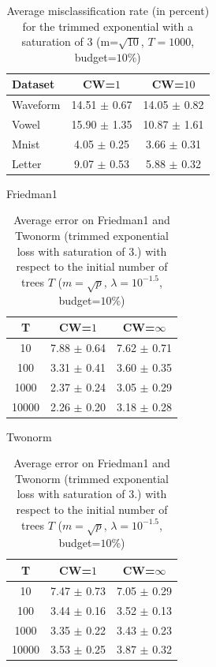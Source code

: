 \documentclass{article}
\newcommand{\bestA}{\cellcolor{orange}}
\begin{document}
\begin{table}[t]
\caption{Average misclassification rate (in percent) for the trimmed 
exponential with a saturation of $3$ (m=$\sqrt{10}$, $T=1000$, budget=$10\%$)}
\label{tab:cwMulti}
\vskip 0.15in
\begin{center}
\begin{small}
\begin{sc}
\begin{tabular}{l|cc}
\hline
Dataset & CW=$1$ & CW=$10$ \\
\hline
Waveform & 14.51 $\pm$ 0.67 & \bestA 14.05 $\pm$ 0.82 \\
Vowel & 15.90 $\pm$ 1.35 & \bestA 10.87 $\pm$ 1.61 \\
Mnist & 4.05 $\pm$ 0.25 & \bestA 3.66 $\pm$ 0.31 \\
Letter & 9.07 $\pm$ 0.53 & \bestA 5.88 $\pm$ 0.32 \\
\hline
\end{tabular}
\end{sc}
\end{small}
\end{center}
\vskip -0.1in
\end{table}



\begin{table}[t]
\caption{Average error on Friedman1 and Twonorm (trimmed exponential loss with 
saturation of $3$.) with respect to the initial number of trees $T$
($m=\sqrt{p}$, $\lambda=10^{-1.5}$, budget=$10\%$)}
\label{tab:poolsizeError}
\vskip 0.15in
\begin{center}
\begin{small}
Friedman1\\
\begin{tabular}{c|cc}
\hline
T & CW=$1$ & CW=$\infty$ \\
\hline
10 & 7.88 $\pm$ 0.64 & 7.62 $\pm$ 0.71 \\
100 & 3.31 $\pm$ 0.41 & 3.60 $\pm$ 0.35 \\
1000 & 2.37 $\pm$ 0.24 & 3.05 $\pm$ 0.29 \\
10000 & 2.26 $\pm$ 0.20 & 3.18 $\pm$ 0.28 \\
\hline
\end{tabular}
\par
Twonorm \\
\begin{tabular}{c|cc}
\hline
T & CW=$1$ & CW=$\infty$ \\
\hline
10 & 7.47 $\pm$ 0.73 & 7.05 $\pm$ 0.29 \\
100 & 3.44 $\pm$ 0.16 & 3.52 $\pm$ 0.13 \\
1000 & 3.35 $\pm$ 0.22 & 3.43 $\pm$ 0.23 \\
10000 & 3.53 $\pm$ 0.25 & 3.87 $\pm$ 0.32 \\
\hline
\end{tabular}
\end{small}
\end{center}
\vskip -0.1in
\end{table}
\end{document}
